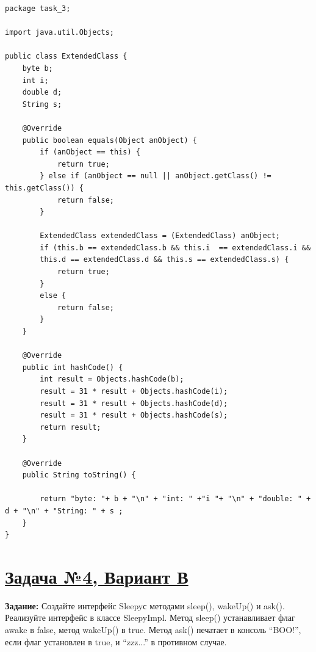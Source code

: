 \documentclass[a4paper]{article}
\begin{document}
\begin{lstlisting}
package task_3;

import java.util.Objects;

public class ExtendedClass {
    byte b;
    int i;
    double d;
    String s;

    @Override
    public boolean equals(Object anObject) {
        if (anObject == this) {
            return true;
        } else if (anObject == null || anObject.getClass() != this.getClass()) {
            return false;
        }

        ExtendedClass extendedClass = (ExtendedClass) anObject;
        if (this.b == extendedClass.b && this.i  == extendedClass.i && 
        this.d == extendedClass.d && this.s == extendedClass.s) {
            return true;
        } 
        else {
            return false;
        }    
    }

    @Override
    public int hashCode() {
        int result = Objects.hashCode(b);
        result = 31 * result + Objects.hashCode(i);
        result = 31 * result + Objects.hashCode(d);
        result = 31 * result + Objects.hashCode(s);
        return result;
    }

    @Override
    public String toString() {

        return "byte: "+ b + "\n" + "int: " +"i "+ "\n" + "double: " + d + "\n" + "String: " + s ;
    }
}
\end{lstlisting}


\newpage

\section{\href{https://github.com/yarvod/NetCracker_LearningCenter/tree/main/Practise_tasks/Practice_task_2/task_4}{Задача №4, Вариант В}}

\textbf{Задание: }Создайте интерфейс Sleepyс методами sleep(), wakeUp() и ask(). Реализуйте интерфейс в классе SleepyImpl. Метод sleep() устанавливает флаг awake в false, метод wakeUp() в true. Метод ask() печатает в консоль “BOO!”, если флаг установлен в true, и “zzz...” в противном случае. \par
\end{document}
